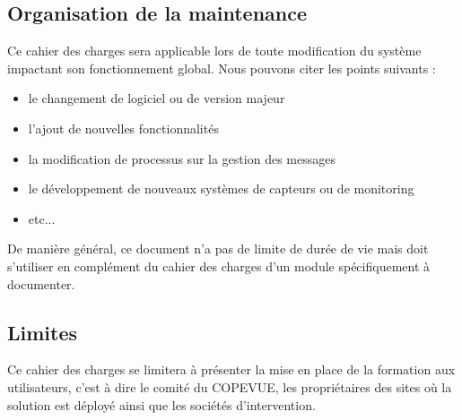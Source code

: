 

\subsection{Organisation de la maintenance}

Ce cahier des charges sera applicable lors de toute modification du système 
impactant son fonctionnement global. Nous pouvons citer les points suivants :
\begin{itemize}
	\item le changement de logiciel ou de version majeur
	\item l'ajout de nouvelles fonctionnalités
	\item la modification de processus sur la gestion des messages
	\item le développement de nouveaux systèmes de capteurs ou de monitoring
	\item etc...
\end{itemize}

De manière général, ce document n'a pas de limite de durée de vie mais doit s'utiliser
en complément du cahier des charges d'un module spécifiquement à documenter.

\subsection{Limites}

Ce cahier des charges se limitera à présenter la mise en place de la formation 
aux utilisateurs, c'est à dire le comité du COPEVUE, les propriétaires des sites
où la solution est déployé ainsi que les sociétés d'intervention.

\pagebreak
